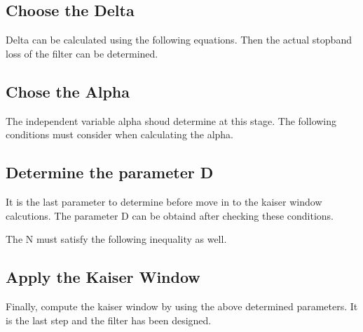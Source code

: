 \documentclass[twoside,12pt,times,onecolumn,a4paper]{report}
\begin{document}

\subsection{Choose the Delta}

\hspace{4em}Delta can be calculated using the following equations. Then the actual stopband loss of the filter can be determined.

\subsection{Chose the Alpha}

\hspace{4em}The independent variable alpha shoud determine at this stage. The following conditions must consider when calculating the alpha.


\subsection{Determine the parameter D}
\hspace{4em}It is the last parameter to determine before move in to the kaiser window calcutions. The parameter D can be obtaind after checking these conditions. 


The N must satisfy the following inequality as well. 


\subsection{Apply the Kaiser Window}

\hspace{4em}Finally, compute the kaiser window by using the above determined parameters. It is the last step and the filter has been designed.

\end{document}
